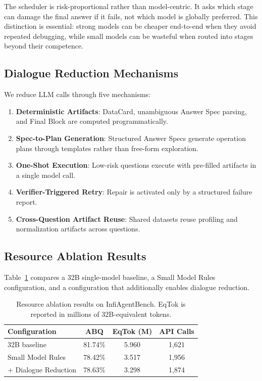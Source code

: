 \documentclass[letterpaper]{article} %
\begin{document}
The scheduler is risk-proportional rather than model-centric.  It asks which stage can damage the final answer if it fails, not which model is globally preferred.  This distinction is essential: strong models can be cheaper end-to-end when they avoid repeated debugging, while small models can be wasteful when routed into stages beyond their competence.

\subsection{Dialogue Reduction Mechanisms}

We reduce LLM calls through five mechanisms:

\begin{enumerate}
    \item \textbf{Deterministic Artifacts}: DataCard, unambiguous Answer Spec parsing, and Final Block are computed programmatically.
    \item \textbf{Spec-to-Plan Generation}: Structured Answer Specs generate operation plans through templates rather than free-form exploration.
    \item \textbf{One-Shot Execution}: Low-risk questions execute with pre-filled artifacts in a single model call.
    \item \textbf{Verifier-Triggered Retry}: Repair is activated only by a structured failure report.
    \item \textbf{Cross-Question Artifact Reuse}: Shared datasets reuse profiling and normalization artifacts across questions.
\end{enumerate}

\subsection{Resource Ablation Results}

Table~\ref{tab:resource_results} compares a 32B single-model baseline, a Small Model Rules configuration, and a configuration that additionally enables dialogue reduction.

\begin{table}[t]
\centering
\caption{Resource ablation results on InfiAgentBench. EqTok is reported in millions of 32B-equivalent tokens.}
\label{tab:resource_results}
\begin{tabular}{lccc}
\toprule
\textbf{Configuration} & \textbf{ABQ} & \textbf{EqTok (M)} & \textbf{API Calls} \\
\midrule
32B baseline & 81.74\% & 5.960 & 1,621 \\
Small Model Rules & 78.42\% & 3.517 & 1,956 \\
+ Dialogue Reduction & 78.63\% & 3.298 & 1,874 \\
\bottomrule
\end{tabular}
\end{table}
\end{document}
